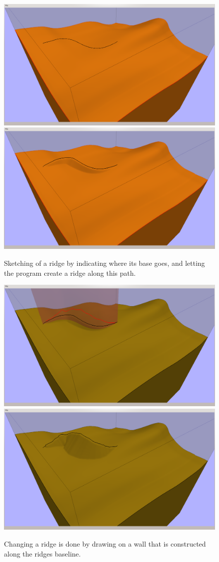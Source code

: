 \documentclass[a4paper,12pt]{report}
\begin{document}
\begin{figure}
\includegraphics[trim = 30mm 80mm 120mm 30mm, clip,width=.5\linewidth]{thesis/results/ridgeDraw.png}
\includegraphics[trim = 30mm 80mm 120mm 30mm, clip,width=.5\linewidth]{thesis/results/ridgeDrawn.png}
 \caption{Sketching of a ridge by indicating where its base goes, and letting the program create a ridge along this path. }
 \label{fig:ridgeDraw}
\end{figure}

\begin{figure}
\includegraphics[trim = 30mm 80mm 120mm 30mm, clip,width=.5\linewidth]{thesis/results/ridgeChange.png}
\includegraphics[trim = 30mm 80mm 120mm 30mm, clip,width=.5\linewidth]{thesis/results/ridgeChanged.png}
 \caption{Changing a ridge is done by drawing on a wall that is constructed along the ridges baseline. }
 \label{fig:ridgeChange}
\end{figure}
\end{document}
